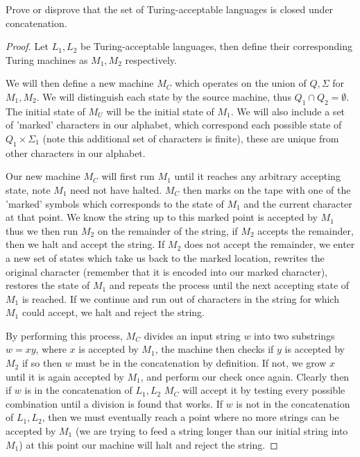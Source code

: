 \documentclass[12pt]{jhwhw}
\begin{document}
\problem{}

	Prove or disprove that the set of Turing-acceptable languages is closed under concatenation.

\solution

\begin{proof}

	Let $L_1, L_2$ be Turing-acceptable languages, then define their corresponding 
	Turing machines as $M_1, M_2$ respectively.

	We will then define a new machine $M_C$ which operates on the union of
	$Q,\Sigma$ for $M_1, M_2$. We will distinguish each state by the source machine,
	thus $Q_1 \cap Q_2 = \emptyset$. The initial state of $M_U$ will be the initial
	state of $M_1$. We will also include a set of 'marked' characters in our alphabet,
	which correspond each possible state of $Q_1\times \Sigma_1$ (note this additional set of 
	characters is finite), these are unique from other characters in our alphabet.

	Our new machine $M_C$ will first run $M_1$ until it reaches any arbitrary accepting state,
	note $M_1$ need not have halted. $M_C$ then marks on the tape with one of the 'marked' symbols
	which corresponds to the state of $M_1$ and the current character at that point. We know
	the string up to this marked point is accepted by $M_1$ thus we then run $M_2$ on the remainder
	of the string, if $M_2$ accepts the remainder, then we halt and accept the string. If $M_2$ does not
	accept the remainder, we enter a new set of states which take us back to the marked location,
	rewrites the original character (remember that it is encoded into our marked character), restores
	the state of $M_1$ and repeats the process until the next accepting state of $M_1$ is reached.
	If we continue and run out of characters in the string for which $M_1$ could accept, we halt
	and reject the string.
	
	By performing this process, $M_C$ divides an input string $w$ into two substrings $w=xy$, where $x$
	is accepted by $M_1$, the machine then checks if $y$ is accepted by $M_2$ if so then $w$ must
	be in the concatenation by definition. If not, we grow $x$ until it is again accepted by $M_1$, 
	and perform our check once again. Clearly then if $w$ is in the concatenation of $L_1, L_2$ $M_C$
	will accept it by testing every possible combination until a division is found that works.
	If $w$ is not in the concatenation of $L_1,L_2$, then we must eventually reach a point where no
	more strings can be accepted by $M_1$ (we are trying to feed a string longer than our initial string
	into $M_1$) at this point our machine will halt and reject the string.

\end{proof}
\end{document}
